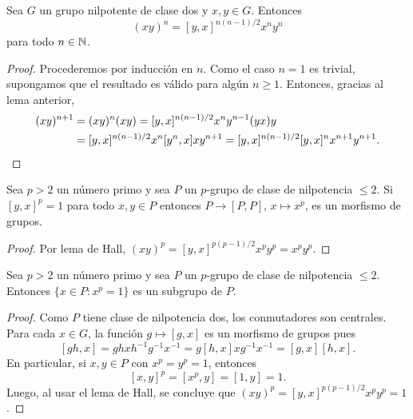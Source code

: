 \begin{lemma}[Hall]
	\label{lemma:Hall}
	Sea $G$ un grupo nilpotente de clase dos y $x,y\in G$. Entonces
	\[
		(xy)^n=[y,x]^{n(n-1)/2}x^ny^n
	\]
	para todo $n\in\mathbb{N}$.
\end{lemma}

\begin{proof}
	Procederemos por inducción en $n$. Como el caso $n=1$ es trivial,
	supongamos que el resultado es válido para algún $n\geq1$. Entonces,
	gracias al lema anterior, 
	\begin{align*}
		(xy)^{n+1} &= (xy)^n(xy)=[y,x]^{n(n-1)/2}x^ny^{n-1}(yx)y\\
		&=[y,x]^{n(n-1)/2}x^{n}[y^n,x]xy^{n+1}=[y,x]^{n(n-1)/2}[y,x]^nx^{n+1}y^{n+1}.\qedhere 
	\end{align*}
\end{proof}

\begin{lemma}
	\label{lemma:class2}
	Sea $p>2$ un número primo y sea 
	$P$ un $p$-grupo de clase de nilpotencia $\leq2$. 
	Si $[y,x]^p=1$ para todo $x,y\in P$ entonces $P\to [P,P]$,
	$x\mapsto x^p$, es un morfismo de grupos.
\end{lemma}

\begin{proof}
	Por lema de Hall,
	$(xy)^p=[y,x]^{p(p-1)/2}x^py^p=x^py^p$. 	
\end{proof}

\begin{theorem}
	\label{thm:class2}
	Sea $p>2$ un número primo y sea 
	$P$ un $p$-grupo de clase de nilpotencia $\leq2$. 
	Entonces $\{x\in P:x^p=1\}$ es un subgrupo de $P$.
\end{theorem}

\begin{proof}
	Como $P$ tiene clase de nilpotencia dos, los conmutadores son centrales.
	Para cada $x\in G$, la función $g\mapsto [g,x]$ es un morfismo de grupos
	pues
	\[
		[gh,x]=ghxh^{-1}g^{-1}x^{-1}=g[h,x]xg^{-1}x^{-1}=[g,x][h,x].
	\]
	En particular, si $x,y\in P$ con $x^p=y^p=1$, entonces
	\[
		[x,y]^p=[x^p,y]=[1,y]=1.
	\]
	Luego, al usar el lema de Hall, se concluye que
	$(xy)^p=[y,x]^{p(p-1)/2}x^py^p=1$.
\end{proof}

